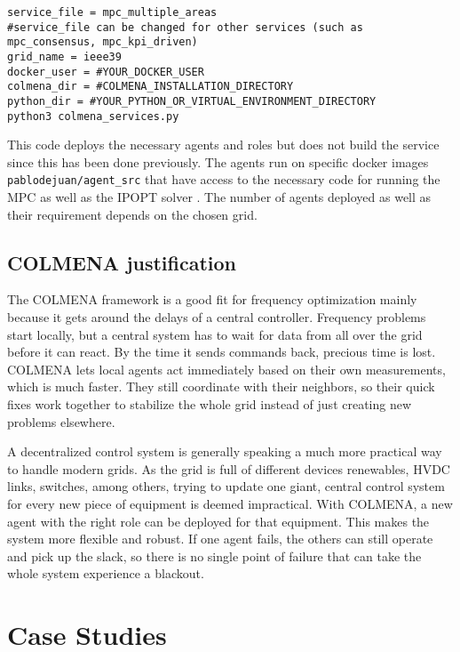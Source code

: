 \documentclass{article}
\begin{document}
\begin{verbatim}
service_file = mpc_multiple_areas 
#service_file can be changed for other services (such as mpc_consensus, mpc_kpi_driven)
grid_name = ieee39 
docker_user = #YOUR_DOCKER_USER 
colmena_dir = #COLMENA_INSTALLATION_DIRECTORY
python_dir = #YOUR_PYTHON_OR_VIRTUAL_ENVIRONMENT_DIRECTORY
python3 colmena_services.py
\end{verbatim}

This code deploys the necessary agents and roles but does not build the service since this has been done previously. The agents run on specific docker images \texttt{pablodejuan/agent\_src} that have access to the necessary code for running the MPC as well as the IPOPT solver \cite{coinor-ipopt}. The number of agents deployed as well as their requirement depends on the chosen grid.

\subsection{COLMENA justification}

The COLMENA framework is a good fit for frequency optimization mainly because it gets around the delays of a central controller. Frequency problems start locally, but a central system has to wait for data from all over the grid before it can react. By the time it sends commands back, precious time is lost. COLMENA lets local agents act immediately based on their own measurements, which is much faster. They still coordinate with their neighbors, so their quick fixes work together to stabilize the whole grid instead of just creating new problems elsewhere.

A decentralized control system is generally speaking a much more practical way to handle modern grids. As the grid is full of different devices renewables, HVDC links, switches, among others, trying to update one giant, central control system for every new piece of equipment is deemed impractical. With COLMENA, a new agent with the right role can be deployed for that equipment. This makes the system more flexible and robust. If one agent fails, the others can still operate and pick up the slack, so there is no single point of failure that can take the whole system experience a blackout. 

\newpage
\section{Case Studies}
\end{document}
